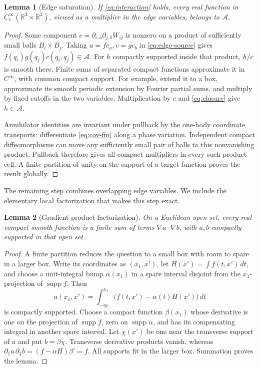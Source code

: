\documentclass[11pt]{article}
\numberwithin{equation}{section}
\newtheorem{lemma}[lemma]{Lemma}
\theoremstyle{definition}
\newcommand{\R}{\mathbb R}
\newcommand{\Cc}{C_c^\infty}
\newcommand{\Acal}{\mathcal A}
\newcommand{\supp}{\operatorname{supp}}
\begin{document}
\begin{lemma}[Edge saturation]\label{lem:edge}
If \eqref{eq:interaction} holds, every real function in
\(\Cc(\R^3\times\R^3)\), viewed as a multiplier in the edge variables, belongs to \(\Acal\).
\end{lemma}

\begin{proof}
Some component \(c=\partial_{i,a}\partial_{j,b}W_{ij}\) is nonzero on a product of sufficiently small balls \(B_i\times B_j\). Taking \(u=f e_a,v=g e_b\) in \eqref{eq:edge-source} gives \(f(q_i)g(q_j)c(q_i,q_j)\in\Acal\). For \(h\) compactly supported inside that product, \(h/c\) is smooth there. Finite sums of separated compact functions approximate it in \(C^\infty\), with common compact support. For example, extend it to a box, approximate its smooth periodic extension by Fourier partial sums, and multiply by fixed cutoffs in the two variables. Multiplication by \(c\) and \eqref{eq:closure} give \(h\in\Acal\).

Annihilator identities are invariant under pullback by the one-body coordinate transports: differentiate \eqref{eq:cov-fin} along a phase variation. Independent compact diffeomorphisms can move any sufficiently small pair of balls to this nonvanishing product. Pullback therefore gives all compact multipliers in every such product cell. A finite partition of unity on the support of a target function proves the result globally.
\end{proof}

The remaining step combines overlapping edge variables. We include the elementary local factorization that makes this step exact.

\begin{lemma}[Gradient-product factorization]\label{lem:factor}
On a Euclidean open set, every real compact smooth function is a finite sum of terms \(\nabla a\cdot\nabla b\), with \(a,b\) compactly supported in that open set.
\end{lemma}

\begin{proof}
A finite partition reduces the question to a small box with room to spare in a larger box. Write its coordinates as \((x_1,x')\), let
\(H(x')=\int f(t,x')\,dt\), and choose a unit-integral bump \(\alpha(x_1)\) in a spare interval disjoint from the \(x_1\)-projection of \(\supp f\). Then
\[
 a(x_1,x')=\int_{-\infty}^{x_1}
       \big(f(t,x')-\alpha(t)H(x')\big)\,dt
\]
is compactly supported. Choose a compact function \(\beta(x_1)\) whose derivative is one on the projection of \(\supp f\), zero on \(\supp\alpha\), and has its compensating integral in another spare interval. Let \(\chi(x')\) be one near the transverse support of \(a\) and put \(b=\beta\chi\). Transverse derivative products vanish, whereas
\(\partial_1a\,\partial_1b=(f-\alpha H)\beta'=f\). All supports fit in the larger box. Summation proves the lemma.
\end{proof}
\end{document}
